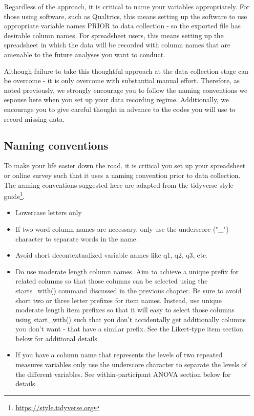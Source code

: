 \documentclass[
]{krantz}
\renewcommand{\href}[2]{#2\footnote{\url{#1}}}
\begin{document}
Regardless of the approach, it is critical to name your variables appropriately. For those using software, such as Qualtrics, this means setting up the software to use appropriate variable names PRIOR to data collection - so the exported file has desirable column names. For spreadsheet users, this means setting up the spreadsheet in which the data will be recorded with column names that are amenable to the future analyses you want to conduct.

Although failure to take this thoughtful approach at the data collection stage can be overcome - it is only overcome with substantial manual effort. Therefore, as noted previously, we strongly encourage you to follow the naming conventions we espouse here when you set up your data recording regime. Additionally, we encourage you to give careful thought in advance to the codes you will use to record missing data.

\hypertarget{naming-conventions}{%
\subsection{Naming conventions}\label{naming-conventions}}

To make your life easier down the road, it is critical you set up your spreadsheet or online survey such that it uses a naming convention prior to data collection. The naming conventions suggested here are adapted from the tidyverse \href{https://style.tidyverse.org}{style guide}.

\begin{itemize}
\item
  Lowercase letters only
\item
  If two word column names are necessary, only use the underscore ("\_") character to separate words in the name.
\item
  Avoid short decontextualized variable names like q1, q2, q3, etc.
\item
  Do use moderate length column names. Aim to achieve a unique prefix for related columns so that those columns can be selected using the starts\_with() command discussed in the previous chapter. Be sure to avoid short two or three letter prefixes for item names. Instead, use unique moderate length item prefixes so that it will easy to select those columns using start\_with() such that you don't accidentally get additionally columns you don't want - that have a similar prefix. See the Likert-type item section below for additional details.
\item
  If you have a column name that represents the levels of two repeated measures variables only use the underscore character to separate the levels of the different variables. See within-participant ANOVA section below for details.
\end{itemize}
\end{document}
